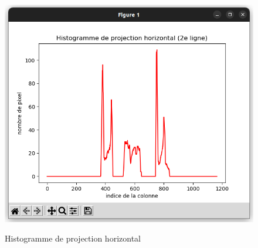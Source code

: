 \documentclass[a4paper]{article}
\begin{document}
		\begin{figure}[H]
			\caption{Histogramme de projection horizontal}
			\includegraphics[width=.7\textwidth]{histoX2.png}
			\centering
			\label{fig:histoX2}
		\end{figure}
\end{document}
